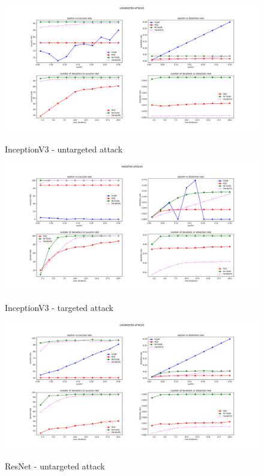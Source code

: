 \documentclass[10pt,twocolumn,letterpaper, english]{article}
\theoremstyle{definition}
\theoremstyle{plain}
\theoremstyle{plain}
\theoremstyle{plain}
\theoremstyle{plain}
\theoremstyle{remark}
\theoremstyle{remark}
\theoremstyle{definition}
\theoremstyle{definition}
\theoremstyle{definition}
\theoremstyle{definition}
\begin{document}
\begin{figure}[ht]
  \centering
  \includegraphics[width=\textwidth]{./Images/inceptionv3_untargeted_grid.pdf}\\
  \caption{InceptionV3 - untargeted attack } \label{incV3-unt}
\end{figure}

\begin{figure}[ht]
  \centering
  \includegraphics[width=\textwidth]{./Images/InceptionV3-targeted_grid.pdf}\\
  \caption{InceptionV3 - targeted attack } \label{incV3-t}
\end{figure}

\begin{figure}[ht]
  \centering
  \includegraphics[width=\textwidth]{./Images/ResNet-untargeted_grid.pdf}\\
  \caption{ResNet - untargeted attack } \label{res-unt}
\end{figure}
\end{document}
